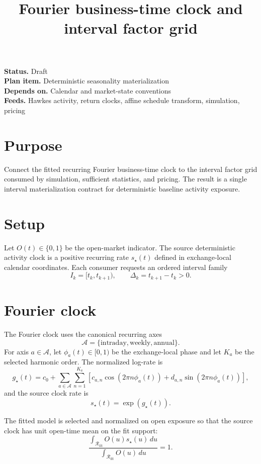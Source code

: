 \documentclass[11pt]{article}
\title{Fourier business-time clock and interval factor grid}
\author{}
\date{}
\begin{document}
\maketitle

\noindent\textbf{Status.} Draft\\
\textbf{Plan item.} Deterministic seasonality materialization\\
\textbf{Depends on.} Calendar and market-state conventions\\
\textbf{Feeds.} Hawkes activity, return clocks, affine schedule transform, simulation, pricing

\section{Purpose}

Connect the fitted recurring Fourier business-time clock to the interval
factor grid consumed by simulation, sufficient statistics, and pricing.
The result is a single interval materialization contract for deterministic
baseline activity exposure.

\section{Setup}

Let \(O(t)\in\{0,1\}\) be the open-market indicator.
The source deterministic activity clock is a positive recurring rate \(s_\star(t)\)
defined in exchange-local calendar coordinates.
Each consumer requests an ordered interval family
\[
    I_k=[t_k,t_{k+1}),\qquad \Delta_k=t_{k+1}-t_k>0.
\]

\section{Fourier clock}

The Fourier clock uses the canonical recurring axes
\[
    \mathcal A
    =
    \{\mathrm{intraday},\mathrm{weekly},\mathrm{annual}\}.
\]
For axis \(a\in\mathcal A\), let \(\phi_a(t)\in[0,1)\) be the exchange-local
phase and let \(K_a\) be the selected harmonic order.
The normalized log-rate is
\[
    g_\star(t)
    =
    c_0
    +
    \sum_{a\in\mathcal A}
    \sum_{n=1}^{K_a}
    \left[
        c_{a,n}\cos(2\pi n\phi_a(t))
        +
        d_{a,n}\sin(2\pi n\phi_a(t))
    \right],
\]
and the source clock rate is
\[
    s_\star(t)=\exp(g_\star(t)).
\]

The fitted model is selected and normalized on open exposure so that the
source clock has unit open-time mean on the fit support:
\[
    \frac{
        \int_{\mathcal R_{\mathrm{fit}}}O(u)s_\star(u)\,du
    }{
        \int_{\mathcal R_{\mathrm{fit}}}O(u)\,du
    }
    =
    1.
\]
\end{document}
